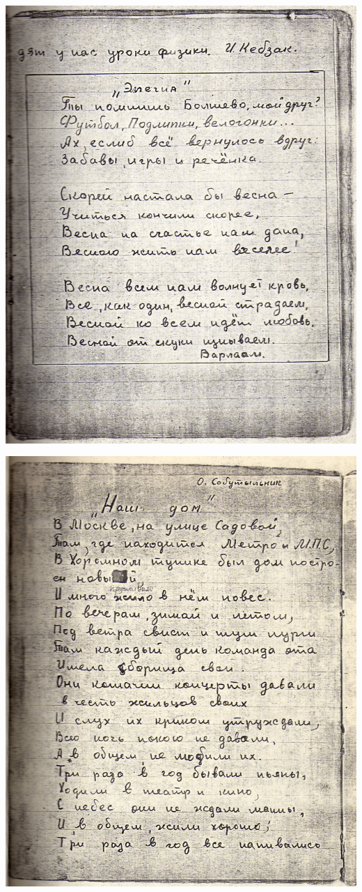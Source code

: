 \newpage


\noindent
\includegraphics[width=\textwidth]{inc/Vynd/Vynd004}

\noindent
\includegraphics[width=\textwidth]{inc/Vynd/Vynd005}

